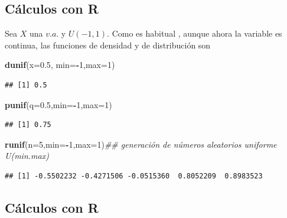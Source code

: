 \documentclass[]{book}
\newenvironment{Shaded}{\begin{snugshade}}{\end{snugshade}}
\newcommand{\CommentTok}[1]{\textcolor[rgb]{0.56,0.35,0.01}{\textit{#1}}}
\newcommand{\DataTypeTok}[1]{\textcolor[rgb]{0.13,0.29,0.53}{#1}}
\newcommand{\DecValTok}[1]{\textcolor[rgb]{0.00,0.00,0.81}{#1}}
\newcommand{\FloatTok}[1]{\textcolor[rgb]{0.00,0.00,0.81}{#1}}
\newcommand{\KeywordTok}[1]{\textcolor[rgb]{0.13,0.29,0.53}{\textbf{#1}}}
\newcommand{\NormalTok}[1]{#1}
\newcommand{\OperatorTok}[1]{\textcolor[rgb]{0.81,0.36,0.00}{\textbf{#1}}}
\begin{document}
\hypertarget{cuxe1lculos-con-r-13}{%
\subsection{Cálculos con R}\label{cuxe1lculos-con-r-13}}

Sea \(X\) una \(v.a.\) y \(U(-1,1)\). Como es habitual , aunque ahora la variable es continua, las funciones de densidad y de distribución son

\begin{Shaded}
\begin{Highlighting}[]
\KeywordTok{dunif}\NormalTok{(}\DataTypeTok{x=}\FloatTok{0.5}\NormalTok{, }\DataTypeTok{min=}\OperatorTok{-}\DecValTok{1}\NormalTok{,}\DataTypeTok{max=}\DecValTok{1}\NormalTok{)}
\end{Highlighting}
\end{Shaded}

\begin{verbatim}
## [1] 0.5
\end{verbatim}

\begin{Shaded}
\begin{Highlighting}[]
\KeywordTok{punif}\NormalTok{(}\DataTypeTok{q=}\FloatTok{0.5}\NormalTok{,}\DataTypeTok{min=}\OperatorTok{-}\DecValTok{1}\NormalTok{,}\DataTypeTok{max=}\DecValTok{1}\NormalTok{)}
\end{Highlighting}
\end{Shaded}

\begin{verbatim}
## [1] 0.75
\end{verbatim}

\begin{Shaded}
\begin{Highlighting}[]
\KeywordTok{runif}\NormalTok{(}\DataTypeTok{n=}\DecValTok{5}\NormalTok{,}\DataTypeTok{min=}\OperatorTok{-}\DecValTok{1}\NormalTok{,}\DataTypeTok{max=}\DecValTok{1}\NormalTok{)}\CommentTok{## generación de números aleatorios uniforme U(min.max)}
\end{Highlighting}
\end{Shaded}

\begin{verbatim}
## [1] -0.5502232 -0.4271506 -0.0515360  0.8052209  0.8983523
\end{verbatim}

\hypertarget{cuxe1lculos-con-r-14}{%
\subsection{Cálculos con R}\label{cuxe1lculos-con-r-14}}
\end{document}
